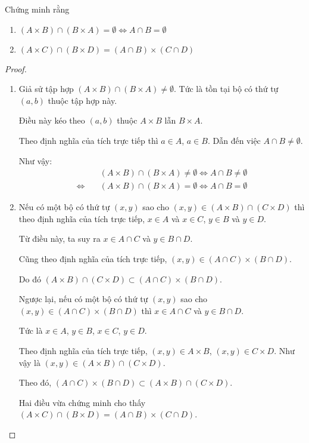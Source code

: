 \documentclass[class=linearalgebra,crop=false]{standalone}
\begin{document}
\begin{exercise}Chứng minh rằng
    \begin{enumerate}[itemsep=0pt,label = (\alph*)]
        \item $(A\times B)\cap (B\times A) = \emptyset \Longleftrightarrow A\cap B = \emptyset$
        \item $(A\times C)\cap (B\times D) = (A\cap B)\times (C\cap D)$
    \end{enumerate}
\end{exercise}

\begin{proof}
    \begin{enumerate}[label = (\alph*)]
        \item Giả sử tập hợp $(A\times B)\cap (B\times A)\ne\emptyset$. Tức là tồn tại bộ có thứ tự $(a, b)$ thuộc tập hợp này.
        \par Điều này kéo theo $(a, b)$ thuộc $A\times B$ lẫn $B\times A$.
        \par Theo định nghĩa của tích trực tiếp thì $a \in A$, $a\in B$. Dẫn đến việc $A\cap B \ne \emptyset$.
        \par Như vậy:
        \begin{align*}
            & (A\times B)\cap (B\times A)\ne\emptyset \Longleftrightarrow A\cap B\ne\emptyset \\
            \Leftrightarrow\quad & (A\times B)\cap (B\times A) = \emptyset \Longleftrightarrow A\cap B = \emptyset
        \end{align*}

        \item Nếu có một bộ có thứ tự $(x, y)$ sao cho $(x, y)\in (A\times B)\cap (C\times D)$ thì theo định nghĩa của tích trực tiếp, $x\in A$ và $x\in C$, $y\in B$ và $y\in D$.
        \par Từ điều này, ta suy ra $x\in A\cap C$ và $y\in B\cap D$.
        \par Cũng theo định nghĩa của tích trực tiếp, $(x, y)\in (A\cap C)\times(B\cap D)$.
        \par Do đó $(A\times B)\cap (C\times D) \subset (A\cap C)\times(B\cap D)$.

        \par Ngược lại, nếu có một bộ có thứ tự $(x, y)$ sao cho $(x, y)\in (A\cap C)\times(B\cap D)$ thì $x\in A\cap C$ và $y\in B\cap D$.
        \par Tức là $x\in A$, $y\in B$, $x\in C$, $y\in D$.
        \par Theo định nghĩa của tích trực tiếp, $(x, y)\in A\times B$, $(x, y)\in C\times D$. Như vậy là $(x, y)\in (A\times B)\cap (C\times D)$.
        \par Theo đó, $(A\cap C)\times (B\cap D) \subset (A\times B)\cap (C\times D)$.

        \par Hai điều vừa chứng minh cho thấy $(A\times C)\cap (B\times D) = (A\cap B)\times (C\cap D)$.

    \end{enumerate}
\end{proof}
\end{document}

